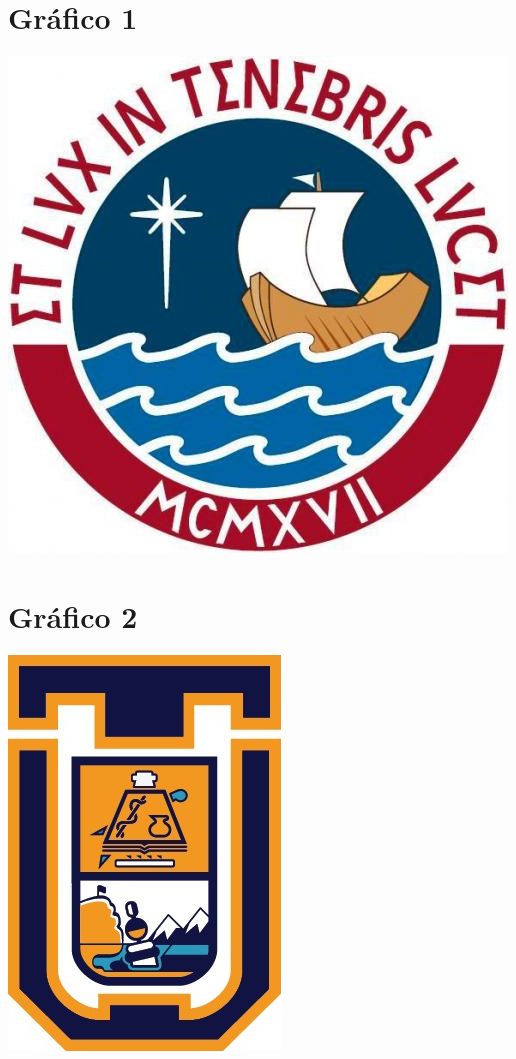 \documentclass[12pt,a4paper]{article}
\begin{document}
\pagebreak

\section{Gráfico 1}
\includegraphics[scale=0.5]{PUCP_4}

\section{Gráfico 2}
\includegraphics[scale=0.5]{logo_uta}
\end{document}
